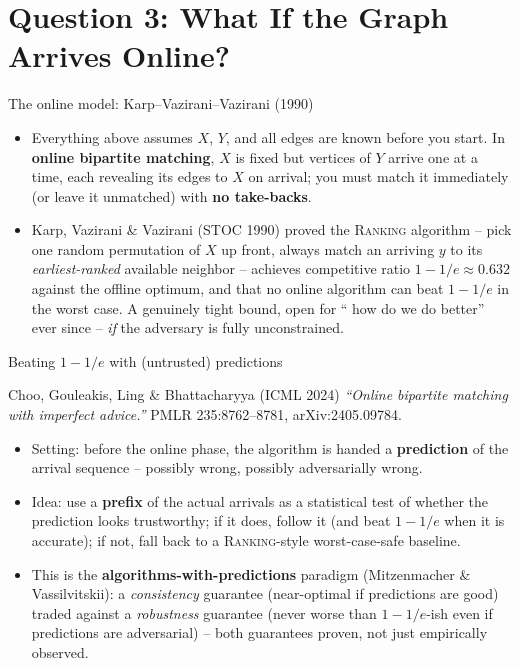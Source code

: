 \documentclass[11pt,aspectratio=169]{beamer}
\begin{document}
\section{Question 3: What If the Graph Arrives Online?}

\begin{frame}{The online model: Karp--Vazirani--Vazirani (1990)}
  \begin{itemize}
    \item Everything above assumes $X$, $Y$, and all edges are known before you start.
    In \textbf{online bipartite matching}, $X$ is fixed but vertices of $Y$ arrive one
    at a time, each revealing its edges to $X$ on arrival; you must match it
    immediately (or leave it unmatched) with \textbf{no take-backs}.
    \item Karp, Vazirani \& Vazirani (STOC 1990) proved the \textsc{Ranking}
    algorithm -- pick one random permutation of $X$ up front, always match an
    arriving $y$ to its \emph{earliest-ranked} available neighbor -- achieves
    competitive ratio $1 - 1/e \approx 0.632$ against the offline optimum, and that no
    online algorithm can beat $1-1/e$ in the worst case. A genuinely tight bound,
    open for `` how do we do better'' ever since -- \emph{if} the adversary is fully
    unconstrained.
  \end{itemize}
\end{frame}

\begin{frame}{Beating $1-1/e$ with (untrusted) predictions}
  \begin{block}{Choo, Gouleakis, Ling \& Bhattacharyya (ICML 2024)}
    \emph{``Online bipartite matching with imperfect advice.''} PMLR 235:8762--8781,
    arXiv:2405.09784.
  \end{block}
  \begin{itemize}
    \item Setting: before the online phase, the algorithm is handed a
    \textbf{prediction} of the arrival sequence -- possibly wrong, possibly
    adversarially wrong.
    \item Idea: use a \textbf{prefix} of the actual arrivals as a statistical test of
    whether the prediction looks trustworthy; if it does, follow it (and beat
    $1-1/e$ when it is accurate); if not, fall back to a \textsc{Ranking}-style
    worst-case-safe baseline.
    \item This is the \textbf{algorithms-with-predictions} paradigm (Mitzenmacher \&
    Vassilvitskii): a \emph{consistency} guarantee (near-optimal if predictions are
    good) traded against a \emph{robustness} guarantee (never worse than $1-1/e$-ish
    even if predictions are adversarial) -- both guarantees proven, not just
    empirically observed.
  \end{itemize}
\end{frame}
\end{document}
